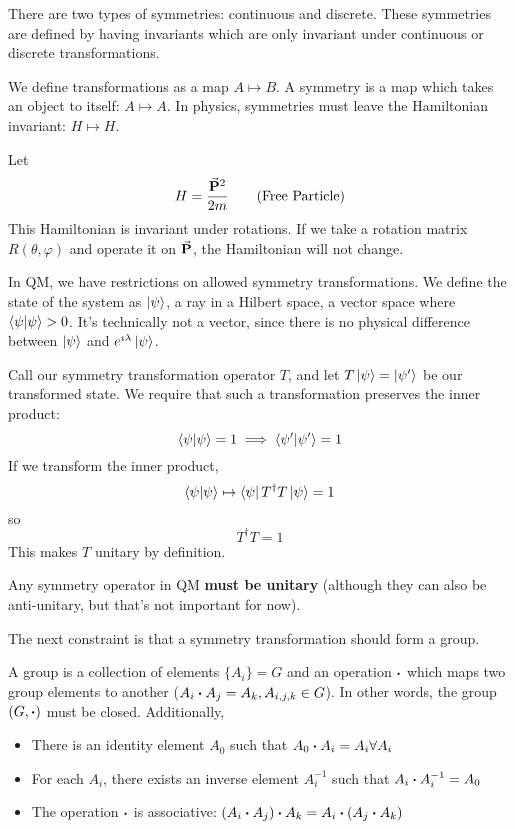 \documentclass[a4paper,twoside,master.tex]{subfiles}
\begin{document}
There are two types of symmetries: continuous and discrete. These symmetries are defined by having invariants which are only invariant under continuous or discrete transformations.

We define transformations as a map $ A \mapsto B $. A symmetry is a map which takes an object to itself: $ A \mapsto A $. In physics, symmetries must leave the Hamiltonian invariant: $ H \mapsto H $.

\begin{ex}
    Let
    \begin{equation}
        H = \frac{\va{P}^2}{2m}\tag{Free Particle}
    \end{equation}
    This Hamiltonian is invariant under rotations. If we take a rotation matrix $ R(\theta, \varphi) $ and operate it on $ \va{P} $, the Hamiltonian will not change.
\end{ex}

In QM, we have restrictions on allowed symmetry transformations. We define the state of the system as $\ket{\psi} $, a ray in a Hilbert space, a vector space where $\bra{\psi}\ket{\psi} > 0 $. It's technically not a vector, since there is no physical difference between $\ket{\psi} $ and $ e^{\imath \lambda}\ket{\psi} $.

Call our symmetry transformation operator $ T $, and let $ T\ket{\psi} =\ket{\psi'} $ be our transformed state. We require that such a transformation preserves the inner product:
\begin{equation}
    \bra{\psi}\ket{\psi} = 1 \implies\bra{\psi'}\ket{\psi'} = 1
\end{equation}
If we transform the inner product,
\begin{equation}
    \bra{\psi}\ket{\psi} \mapsto\bra{\psi} T^\dagger T\ket{\psi} = 1
\end{equation}
so
\begin{equation}
    T^\dagger T = 1
\end{equation}
This makes $ T $ unitary by definition.

Any symmetry operator in QM \textbf{must be unitary} (although they can also be anti-unitary, but that's not important for now).

The next constraint is that a symmetry transformation should form a group.
\begin{definition}[Group]
    A group is a collection of elements $ \{A_i\} = G $ and an operation $ \vdot $ which maps two group elements to another ($ A_i \vdot A_j = A_k, A_{i,j,k} \in G $). In other words, the group $ (G, \vdot) $ must be closed. Additionally,
    \begin{itemize}
        \item There is an identity element $ A_0 $ such that $ A_0 \vdot A_i = A_i \forall A_i $
        \item For each $ A_i $, there exists an inverse element $ A_i^{-1} $ such that $ A_i \vdot A_i^{-1} = A_0 $
        \item The operation $ \vdot $ is associative: $ (A_i \vdot A_j) \vdot A_k = A_i \vdot (A_j \vdot A_k)  $
    \end{itemize}
\end{definition}
\end{document}
